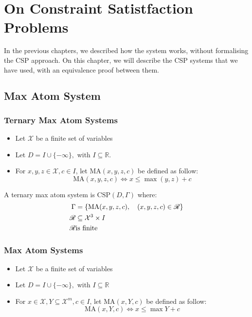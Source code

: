 \chapter{On Constraint Satistfaction Problems}
In the previous chapters, we described how the system works, without formalising the CSP approach.\newline
On this chapter, we will describe the CSP systems that we have used, with an equivalence proof between them.



\section{Max Atom System}
\subsection{Ternary Max Atom Systems}
\begin{itemize}
	\item Let $\mathcal{X}$ be a finite set of variables
	\item Let $D=I\cup \{-\infty\},$ with $I\subseteq \mathbb{R}$.
	\item  For $x,y,z\in \mathcal{X},c\in I$, let $\text{MA}(x,y,z,c)$ be defined as follow:
	$$
	\text{MA}(x,y,z,c)\iff x\le \max(y,z)+c
	$$
\end{itemize}

A ternary max atom system is $\text{CSP}(D,\Gamma)$ where:
\begin{align*}
	\Gamma&=\left\{\text{MA}(x,y,z,c),\quad (x,y,z,c)\in \mathscr{R}\right\}\\
	\mathscr{R}&\subseteq \mathcal{X}^3\times I\\
	\mathscr{R}& \space \text{is finite}
\end{align*}



\subsection{Max Atom Systems}
\begin{itemize}
	\item Let $\mathcal{X}$ be a finite set of variables
	\item Let $D=I\cup \{-\infty\},$ with $I\subseteq \mathbb{R}$   
	\item For $x\in \mathcal{X},Y\subseteq\mathcal{X}^m,c\in I$, let $\text{MA}(x,Y,c)$ be defined as follow:
	$$
	\text{MA}(x,Y,c)\iff x\le \max Y+c
	$$
\end{itemize}

